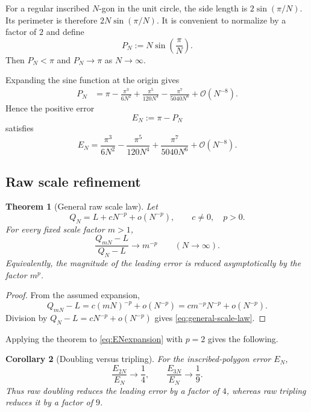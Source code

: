\documentclass[12pt]{article}
\newtheorem{theorem}{Theorem}[section]
\newtheorem{corollary}[theorem]{Corollary}
\theoremstyle{definition}
\theoremstyle{remark}
\newcommand{\Order}{\mathcal{O}}
\begin{document}
For a regular inscribed $N$-gon in the unit circle, the side length is
$2\sin(\pi/N)$.  Its perimeter is therefore $2N\sin(\pi/N)$.  It is convenient
to normalize by a factor of $2$ and define
\begin{equation}
  P_N:=N\sin\!\left(\frac{\pi}{N}\right).
  \label{eq:PN}
\end{equation}
Then $P_N<\pi$ and $P_N\to\pi$ as $N\to\infty$.

Expanding the sine function at the origin gives
\begin{equation}
\begin{aligned}
  P_N
  &=\pi-\frac{\pi^3}{6N^2}
       +\frac{\pi^5}{120N^4}
       -\frac{\pi^7}{5040N^6}
       +\Order(N^{-8}).
\end{aligned}
\label{eq:PNexpansion}
\end{equation}
Hence the positive error
\begin{equation}
  E_N:=\pi-P_N
  \label{eq:EN}
\end{equation}
satisfies
\begin{equation}
  E_N=\frac{\pi^3}{6N^2}
      -\frac{\pi^5}{120N^4}
      +\frac{\pi^7}{5040N^6}
      +\Order(N^{-8}).
  \label{eq:ENexpansion}
\end{equation}

\subsection{Raw scale refinement}

\begin{theorem}[General raw scale law]
Let
\[
  Q_N=L+cN^{-p}+o(N^{-p}),
  \qquad c\ne0,\quad p>0.
\]
For every fixed scale factor $m>1$,
\begin{equation}
  \frac{Q_{mN}-L}{Q_N-L}\longrightarrow m^{-p}
  \qquad (N\to\infty).
  \label{eq:general-scale-law}
\end{equation}
Equivalently, the magnitude of the leading error is reduced asymptotically by
the factor $m^p$.
\end{theorem}

\begin{proof}
From the assumed expansion,
\[
  Q_{mN}-L=c(mN)^{-p}+o(N^{-p})
          =cm^{-p}N^{-p}+o(N^{-p}).
\]
Division by $Q_N-L=cN^{-p}+o(N^{-p})$ gives
\eqref{eq:general-scale-law}.
\end{proof}

Applying the theorem to \eqref{eq:ENexpansion} with $p=2$ gives the following.

\begin{corollary}[Doubling versus tripling]
For the inscribed-polygon error $E_N$,
\[
  \frac{E_{2N}}{E_N}\longrightarrow\frac14,
  \qquad
  \frac{E_{3N}}{E_N}\longrightarrow\frac19.
\]
Thus raw doubling reduces the leading error by a factor of $4$, whereas raw
tripling reduces it by a factor of $9$.
\end{corollary}
\end{document}
